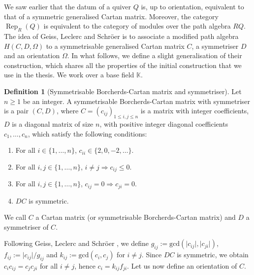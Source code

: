 \documentclass[11pt,english]{article}
\numberwithin{equation}{section}
\numberwithin{figure}{section}
\theoremstyle{definition}
\newtheorem{df}{Definition}[subsection]
\theoremstyle{plain}
\theoremstyle{remark}
\DeclareMathOperator{\Rep}{Rep}
\newcommand\KK{\mathbb{K}}
\begin{document}
We saw earlier that the datum of a quiver $Q$ is, up to orientation,
equivalent to that of a symmetric generalised Cartan matrix. Moreover,
the category $\Rep_{R}(Q)$ is equivalent to the category of modules
over the path algebra $RQ$. The idea of Geiss, Leclerc and Schröer
is to associate a modified path algebra $H(C,D,\Omega)$ to a symmetrisable
generalised Cartan matrix $C$, a symmetriser $D$ and an orientation
$\Omega$. In what follows, we define a slight generalisation of their
construction, which shares all the properties of the initial construction
that we use in the thesis. We work over a base field $\KK$.

\begin{df}[Symmetrisable Borcherds-Cartan matrix and symmetriser]

Let $n\geq1$ be an integer. A symmetrisable Borcherds-Cartan matrix
with symmetriser is a pair $(C,D)$, where $C=(c_{ij})_{1\leq i,j\leq n}$
is a matrix with integer coefficients, $D$ is a diagonal matrix of
size $n$, with positive integer diagonal coefficients $c_{1},\ldots,c_{n}$,
which satisfy the following conditions:

\begin{enumerate}[align=left]

\item[(BC1)] For all $i\in\{1,\ldots,n\}$, $c_{ii}\in\{2,0,-2,\ldots\}$.

\item[(BC2)] For all $i,j\in\{1,\ldots,n\}$, $i\ne j\Rightarrow c_{ij}\leq0$.

\item[(BC3)] For all $i,j\in\{1,\ldots,n\}$, $c_{ij}=0\Rightarrow c_{ji}=0$.

\item[(BC4)] $DC$ is symmetric.

\end{enumerate}

We call $C$ a Cartan matrix (or symmetrisable Borcherds-Cartan matrix)
and $D$ a symmetriser of $C$.

\end{df}

Following Geiss, Leclerc and Schröer \cite{GLS17a}, we define $g_{ij}:=\mathrm{gcd}(\vert c_{ij}\vert,\vert c_{ji}\vert)$,
$f_{ij}:=\vert c_{ij}\vert/g_{ij}$ and $k_{ij}:=\mathrm{gcd}(c_{i},c_{j})$
for $i\ne j$. Since $DC$ is symmetric, we obtain $c_{i}c_{ij}=c_{j}c_{ji}$
for all $i\ne j$, hence $c_{i}=k_{ij}f_{ji}$. Let us now define
an orientation of $C$.
\end{document}
